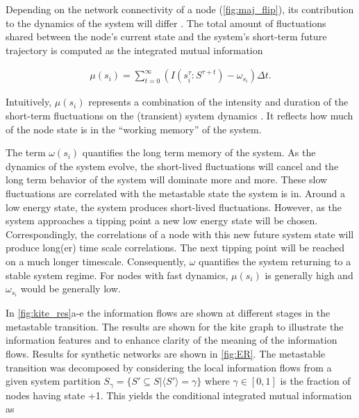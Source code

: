 \documentclass[a4paper, 11pt, twocolumn]{article}
\begin{document}
Depending   on   the   network  connectivity   of   a   node
(\cref{fig:maj_flip}), its  contribution to the  dynamics of
the  system  will differ  \cite{vanElteren2022,Quax2013}.  The
total  amount  of  fluctuations shared  between  the  node's
current state and the  system's short-term future trajectory
is computed as the integrated mutual information

\begin{equation}
\label{eq:adj_imi}
\begin{split}
\mu(s_i) = \sum_{t = 0}^\infty (I(s_i^{\tau} : S^{\tau + t}) - \omega_{s_i}) \Delta t.
\end{split}
\end{equation}

Intuitively,  \(\mu(s_i)\)  represents   a  combination  of  the
intensity and duration of the short-term fluctuations on the
(transient) system dynamics \cite{vanElteren2022}. It reflects
how much of the node state is in the ``working memory'' of the
system.

The term  \(\omega(s_i)\) quantifies  the long  term memory  of the
system.  As   the  dynamics   of  the  system   evolve,  the
short-lived  fluctuations  will  cancel and  the  long  term
behavior of  the system will  dominate more and  more. These
slow fluctuations  are correlated with the  metastable state
the  system is  in. Around  a low  energy state,  the system
produces  short-lived fluctuations.  However, as  the system
approaches a  tipping point a  new low energy state  will be
chosen.  Correspondingly, the  correlations of  a node  with
this  new future  system  state will  produce long(er)  time
scale correlations.  The next tipping point  will be reached
on a  much longer timescale. Consequently,  \(\omega\) quantifies
the system  returning to a  stable system regime.  For nodes
with  fast  dynamics,  \(\mu(s_i)\)   is  generally  high  and
\(\omega_{s_i}\) would be generally low.

In \cref{fig:kite_res}{a-e} the  information flows are shown
at  different  stages  in  the  metastable  transition.  The
results  are shown  for  the kite  graph  to illustrate  the
information features  and to enhance clarity  of the meaning
of the information flows. Results for synthetic networks are
shown  in  \cref{fig:ER}.   The  metastable  transition  was
decomposed by considering the local information flows from a
given system partition \(S_{\gamma}  = \{S' \subseteq S | \langle  S' \rangle = \gamma\}\)
where \(\gamma  \in [0,1]\) is  the fraction of nodes  having state
+1.   This   yields   the  conditional   integrated   mutual
information as
\end{document}
